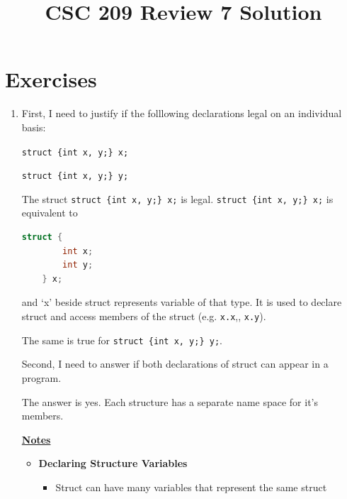 \documentclass[12pt]{article}
\begin{document}
\title{CSC 209 Review 7 Solution}
\maketitle

\bigskip

\section{Exercises}

\begin{enumerate}[1.]
    \item

    First, I need to justify if the folllowing declarations legal on an individual basis:

    \bigskip

    \texttt{struct \{int x, y;\} x;}

    \texttt{struct \{int x, y;\} y;}

    \bigskip

    The struct \texttt{struct \{int x, y;\} x;} is legal. \texttt{struct \{int x, y;\} x;}
    is equivalent to

\begin{lstlisting}[language=c]
    struct {
        int x;
        int y;
    } x;
\end{lstlisting}

    and `x' beside struct represents variable of that type. It is used to declare struct
    and access members of the struct (e.g. \texttt{x.x},, \texttt{x.y}).

    \bigskip

    The same is true for \texttt{struct \{int x, y;\} y;}.

    \bigskip

    Second, I need to answer if both declarations of struct can appear in a program.

    \bigskip

    The answer is yes. Each structure has a separate name space for it's members.

    \bigskip

    \underline{\textbf{Notes}}

    \begin{itemize}
        \item \textbf{Declaring Structure Variables}

        \begin{itemize}
            \item Struct can have many variables that represent the same struct


\end{itemize}
\end{itemize}
\end{enumerate}
\end{document}
